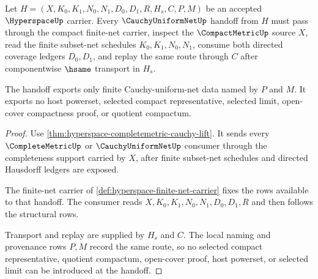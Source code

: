 \begin{theorem}
\label{thm:hyperspace-cauchy-uniform-net-handoff}
Let $H=(X,K_0,K_1,N_0,N_1,D_0,D_1,R,H_s,C,P,M)$ be an accepted $\HyperspaceUp$ carrier. Every $\CauchyUniformNetUp$ handoff from $H$ must pass through the compact finite-net carrier, inspect the $\CompactMetricUp$ source $X$, read the finite subset-net schedules $K_0,K_1,N_0,N_1$, consume both directed coverage ledgers $D_0,D_1$, and replay the same route through $C$ after componentwise $\hsame$ transport in $H_s$.

The handoff exports only finite Cauchy-uniform-net data named by $P$ and $M$. It exports no host powerset, selected compact representative, selected limit, open-cover compactness proof, or quotient compactum.
\end{theorem}
\begin{proof}
Use \autoref{thm:hyperspace-completemetric-cauchy-lift}. It sends every $\CompleteMetricUp$ or $\CauchyUniformNetUp$ consumer through the completeness support carried by $X$, after finite subset-net schedules and directed Hausdorff ledgers are exposed.

The finite-net carrier of \autoref{def:hyperspace-finite-net-carrier} fixes the rows available to that handoff. The consumer reads $X,K_0,K_1,N_0,N_1,D_0,D_1,R$ and then follows the structural rows.

Transport and replay are supplied by $H_s$ and $C$. The local naming and provenance rows $P,M$ record the same route, so no selected compact representative, quotient compactum, open-cover proof, host powerset, or selected limit can be introduced at the handoff.
\end{proof}

